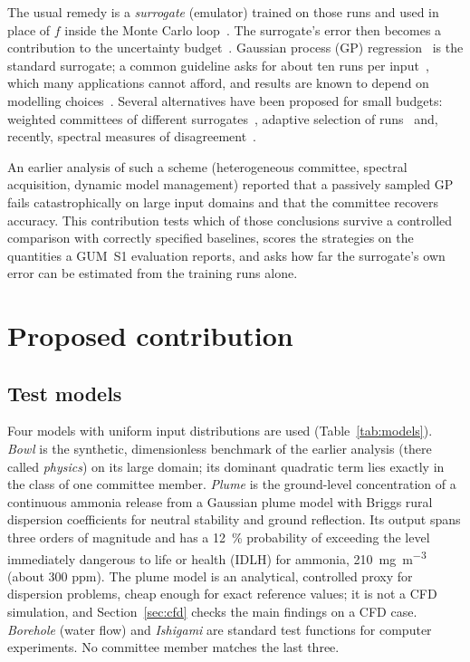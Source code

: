 \documentclass{imeko_wc}
\begin{document}
The usual remedy is a \emph{surrogate} (emulator) trained on those runs and
used in place of $f$ inside the Monte Carlo loop~\cite{heidenreich2017,
wang2022,ohagan2006}. The surrogate's error then becomes a contribution to the
uncertainty budget~\cite{kennedy2001}. Gaussian process (GP)
regression~\cite{sacks1989,rw2006} is the standard surrogate; a common
guideline asks for about ten runs per input~\cite{loeppky2009}, which many
applications cannot afford, and results are known to depend on modelling
choices~\cite{chen2016}. Several alternatives have been proposed for small
budgets: weighted committees of different surrogates~\cite{goel2007,
viana2009}, adaptive selection of runs~\cite{gramacy2009} and, recently,
spectral measures of disagreement~\cite{lin2024}.

An earlier analysis of such a scheme (heterogeneous committee, spectral
acquisition, dynamic model management) reported that a passively sampled GP
fails catastrophically on large input domains and that the committee recovers
accuracy. This contribution tests which of those conclusions survive a
controlled comparison with correctly specified baselines, scores the
strategies on the quantities a GUM~S1 evaluation reports, and asks how far the
surrogate's own error can be estimated from the training runs alone.

\section{Proposed contribution}
\subsection{Test models}
Four models with uniform input distributions are used (Table~\ref{tab:models}).
\emph{Bowl} is the synthetic, dimensionless benchmark of the earlier
analysis (there called \emph{physics}) on its large domain; its dominant
quadratic term lies exactly in the class of one committee member.
\emph{Plume} is the ground-level concentration of a continuous ammonia
release from a Gaussian plume model with Briggs rural dispersion coefficients
for neutral stability and ground reflection. Its output spans three orders of
magnitude and has a \qty{12}{\percent} probability of exceeding the level
immediately dangerous to life or health (IDLH) for ammonia,
\qty{210}{\milli\gram\per\cubic\metre} (about \num{300} ppm). The plume model
is an analytical, controlled proxy for dispersion problems, cheap enough for
exact reference values; it is not a CFD simulation, and
Section~\ref{sec:cfd} checks the main findings on a CFD case. \emph{Borehole}
(water flow) and \emph{Ishigami} are standard test functions for computer
experiments. No committee member matches the last three.
\end{document}
